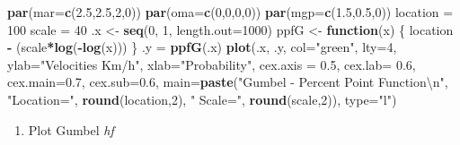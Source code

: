 \documentclass[12pt,oneside]{reedthesis}
\newenvironment{Shaded}{\begin{snugshade}}{\end{snugshade}}
\newcommand{\CharTok}[1]{\textcolor[rgb]{0.31,0.60,0.02}{#1}}
\newcommand{\ControlFlowTok}[1]{\textcolor[rgb]{0.13,0.29,0.53}{\textbf{#1}}}
\newcommand{\DataTypeTok}[1]{\textcolor[rgb]{0.13,0.29,0.53}{#1}}
\newcommand{\DecValTok}[1]{\textcolor[rgb]{0.00,0.00,0.81}{#1}}
\newcommand{\FloatTok}[1]{\textcolor[rgb]{0.00,0.00,0.81}{#1}}
\newcommand{\KeywordTok}[1]{\textcolor[rgb]{0.13,0.29,0.53}{\textbf{#1}}}
\newcommand{\NormalTok}[1]{#1}
\newcommand{\OperatorTok}[1]{\textcolor[rgb]{0.81,0.36,0.00}{\textbf{#1}}}
\newcommand{\StringTok}[1]{\textcolor[rgb]{0.31,0.60,0.02}{#1}}
\providecommand{\tightlist}{%
  \setlength{\itemsep}{0pt}\setlength{\parskip}{0pt}}
\begin{document}
\vspace{0.4cm}
\begin{Shaded}
\begin{Highlighting}[]
\KeywordTok{par}\NormalTok{(}\DataTypeTok{mar=}\KeywordTok{c}\NormalTok{(}\FloatTok{2.5}\NormalTok{,}\FloatTok{2.5}\NormalTok{,}\DecValTok{2}\NormalTok{,}\DecValTok{0}\NormalTok{))}
\KeywordTok{par}\NormalTok{(}\DataTypeTok{oma=}\KeywordTok{c}\NormalTok{(}\DecValTok{0}\NormalTok{,}\DecValTok{0}\NormalTok{,}\DecValTok{0}\NormalTok{,}\DecValTok{0}\NormalTok{))}
\KeywordTok{par}\NormalTok{(}\DataTypeTok{mgp=}\KeywordTok{c}\NormalTok{(}\FloatTok{1.5}\NormalTok{,}\FloatTok{0.5}\NormalTok{,}\DecValTok{0}\NormalTok{))}
\NormalTok{location =}\StringTok{ }\DecValTok{100}
\NormalTok{scale =}\StringTok{ }\DecValTok{40}
\NormalTok{.x <-}\StringTok{ }\KeywordTok{seq}\NormalTok{(}\DecValTok{0}\NormalTok{, }\DecValTok{1}\NormalTok{, }\DataTypeTok{length.out=}\DecValTok{1000}\NormalTok{)}
\NormalTok{ppfG <-}\StringTok{ }\ControlFlowTok{function}\NormalTok{(x) \{}
\NormalTok{  location }\OperatorTok{-}\StringTok{ }\NormalTok{(scale}\OperatorTok{*}\KeywordTok{log}\NormalTok{(}\OperatorTok{-}\KeywordTok{log}\NormalTok{(x)))}
\NormalTok{  \}}
\NormalTok{.y =}\StringTok{ }\KeywordTok{ppfG}\NormalTok{(.x)}
\KeywordTok{plot}\NormalTok{(.x, .y, }\DataTypeTok{col=}\StringTok{"green"}\NormalTok{, }\DataTypeTok{lty=}\DecValTok{4}\NormalTok{, }\DataTypeTok{ylab=}\StringTok{"Velocities Km/h"}\NormalTok{, }\DataTypeTok{xlab=}\StringTok{"Probability"}\NormalTok{, }\DataTypeTok{cex.axis =} \FloatTok{0.5}\NormalTok{, }\DataTypeTok{cex.lab=} \FloatTok{0.6}\NormalTok{, }\DataTypeTok{cex.main=}\FloatTok{0.7}\NormalTok{, }\DataTypeTok{cex.sub=}\FloatTok{0.6}\NormalTok{,}
 \DataTypeTok{main=}\KeywordTok{paste}\NormalTok{(}\StringTok{"Gumbel - Percent Point Function}\CharTok{\textbackslash{}n}\StringTok{"}\NormalTok{, }\StringTok{"Location="}\NormalTok{, }\KeywordTok{round}\NormalTok{(location,}\DecValTok{2}\NormalTok{), }\StringTok{" Scale="}\NormalTok{, }\KeywordTok{round}\NormalTok{(scale,}\DecValTok{2}\NormalTok{)), }\DataTypeTok{type=}\StringTok{"l"}\NormalTok{)}
\end{Highlighting}
\end{Shaded}
\normalsize
\begin{enumerate}
\def\labelenumi{\arabic{enumi}.}
\setcounter{enumi}{4}
\tightlist
\item
  Plot Gumbel \emph{hf}
\end{enumerate}
\tiny
\end{document}
